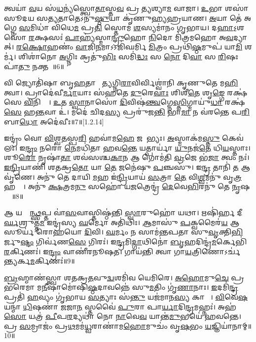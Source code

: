 𑌤𑍍𑌵𑌯𑌾॑ \ul{𑌵}𑌯 𑌸॑\ul{𑌧}𑌨𑍍𑌯॑𑌸𑍍𑌤𑍍𑌵𑍋\ul{𑌤𑌾}𑌸𑍍𑌤\ul{𑌵} 𑌪𑍍𑌰𑌣𑍀᳚𑌤𑍍𑌯𑌶𑍍𑌯𑌾\ul{𑌮} 𑌵𑌾𑌜𑌾\sn{}। \ul{𑌉}𑌭𑌾 𑌶𑌸𑌾॑ 𑌸𑍂𑌦𑌯 𑌸𑌤𑍍𑌯𑌤𑌾𑌤𑍇𑌽𑌨𑍁\ul{𑌷𑍍𑌠𑍁}𑌯𑌾 𑌕𑍃॑𑌣𑍁𑌹𑍍𑌯𑌹𑍍𑌰𑌯𑌾𑌣। \ul{𑌅}𑌯𑌾 𑌤𑍇॑ 𑌅𑌗𑍍𑌨𑍇 \ul{𑌸}𑌮𑌿𑌧𑌾॑ 𑌵𑌿𑌧𑍇\ul{𑌮} 𑌪𑍍𑌰\ul{𑌤𑌿} 𑌸𑍍𑌤𑍋𑌮॑ \ul{𑌶}𑌸𑍍𑌯𑌮𑌾॑𑌨𑌂 𑌗𑍃𑌭𑌾𑌯। 𑌦\ul{𑌹𑌾}𑌽॒𑌶𑌸𑍋॑ \ul{𑌰}𑌕𑍍𑌷𑌸𑌃॑ \ul{𑌪𑌾}𑌹𑍍𑌯॑𑌸𑍍𑌮𑌾\ul{𑌨𑍍𑌦𑍍𑌰𑍁}𑌹𑍋 \ul{𑌨𑌿}𑌦𑍋 𑌮𑌿॑𑌤𑍍𑌰𑌮𑌹𑍋 𑌅\ul{𑌵}𑌦𑍍𑌯𑌾𑌤𑍍। \ul{𑌰}\ul{𑌕𑍍𑌷𑍋}𑌹𑌣𑌂॑ \ul{𑌵𑌾}𑌜𑌿\ul{𑌨}𑌮𑌾𑌽𑌽𑌜𑌿॑𑌘𑌰𑍍𑌮𑌿 \ul{𑌮𑌿}𑌤𑍍𑌰𑌂 𑌪𑍍𑌰𑌥𑌿॑\ul{𑌷𑍍𑌠}𑌮𑍁𑌪॑ 𑌯𑌾\ul{𑌮𑌿} 𑌶𑌰𑍍𑌮॑। 𑌶𑌿𑌶𑌾॑𑌨𑍋 \ul{𑌅}𑌗𑍍𑌨𑌿𑌃 𑌕𑍍𑌰𑌤𑍁॑\ul{𑌭𑌿𑌃} 𑌸𑌮𑌿॑\ul{𑌦𑍍𑌧𑌃} 𑌸 \ul{𑌨𑍋} 𑌦𑌿\ul{𑌵𑌾} 𑌸 \ul{𑌰𑌿}𑌷𑌃 𑌪𑌾॑\ul{𑌤𑍁} 𑌨𑌕𑍍𑌤𑌮𑍍᳚॥6॥

 𑌵𑌿 𑌜𑍍𑌯𑍋𑌤𑌿॑𑌷𑌾 𑌬𑍃\ul{𑌹}𑌤𑌾 𑌭𑌾᳚\ul{𑌤𑍍𑌯}𑌗𑍍𑌨𑌿\ul{𑌰𑌾}𑌵𑌿𑌰𑍍𑌵𑌿𑌶𑍍𑌵𑌾॑𑌨𑌿 𑌕𑍃𑌣𑍁𑌤𑍇 𑌮\ul{𑌹𑌿}𑌤𑍍𑌵𑌾। 𑌪𑍍𑌰𑌾𑌦𑍇॑𑌵𑍀\ul{𑌰𑍍𑌮𑌾}𑌯𑌾𑌃 𑌸॑𑌹𑌤𑍇 \ul{𑌦𑍁}𑌰𑍇\ul{𑌵𑌾𑌃} 𑌶𑌿𑌶𑍀॑\ul{𑌤𑍇} 𑌶𑍃\ul{𑌙𑍍𑌗𑍇} 𑌰𑌕𑍍𑌷॑𑌸𑍇 \ul{𑌵𑌿}𑌨𑌿𑌕𑍍𑌷𑍇᳚। \ul{𑌉}𑌤 \ul{𑌸𑍍𑌵𑌾}𑌨𑌾𑌸𑍋॑ \ul{𑌦𑌿}𑌵𑌿𑌷॑\ul{𑌨𑍍𑌤𑍍𑌵}𑌗𑍍𑌨𑍇\ul{𑌸𑍍𑌤𑌿}𑌗𑍍𑌮𑌾𑌯𑍁॑\ul{𑌧𑌾} 𑌰𑌕𑍍𑌷॑\ul{𑌸𑍇} 𑌹\ul{𑌨𑍍𑌤}𑌵𑌾 𑌉॑। 𑌮𑌦𑍇॑ 𑌚𑌿𑌦\ul{𑌸𑍍𑌯} 𑌪𑍍𑌰𑌰𑍁॑𑌜\ul{𑌨𑍍𑌤𑌿} 𑌭𑌾\ul{𑌮𑌾} 𑌨 𑌵॑𑌰𑌨𑍍𑌤𑍇 𑌪\ul{𑌰𑌿}𑌬𑌾\ul{𑌧𑍋} 𑌅𑌦𑍇॑𑌵𑍀𑌃॥7॥[1.2.14]

𑌇𑌨𑍍𑌦𑍍𑌰𑌂॑ 𑌵𑍋 \ul{𑌵𑌿}𑌶𑍍𑌵\ul{𑌤}𑌸𑍍𑌪\ul{𑌰𑌿} 𑌹𑌵𑌾॑𑌮\ul{𑌹𑍇} 𑌜𑌨𑍇᳚𑌭𑍍𑌯𑌃। \ul{𑌅}𑌸𑍍𑌮𑌾𑌕॑𑌮\ul{𑌸𑍍𑌤𑍁} 𑌕𑍇𑌵॑𑌲𑌃। 𑌇\ul{𑌨𑍍𑌦𑍍𑌰𑌂} 𑌨𑌰𑍋॑ \ul{𑌨𑍇}𑌮𑌧𑌿॑𑌤𑌾 𑌹𑌵\ul{𑌨𑍍𑌤𑍇} 𑌯𑌤𑍍𑌪𑌾𑌰𑍍𑌯𑌾॑ \ul{𑌯𑍁}𑌨𑌜॑\ul{𑌤𑍇} 𑌧𑌿\ul{𑌯}𑌸𑍍𑌤𑌾𑌃। 𑌶𑍂\ul{𑌰𑍋} 𑌨𑍃𑌷𑌾॑\ul{𑌤𑌾} 𑌶𑌵॑𑌸𑌶𑍍𑌚\ul{𑌕𑌾}𑌨 𑌆 𑌗𑍋𑌮॑𑌤𑌿 \ul{𑌵𑍍𑌰}𑌜𑍇 𑌭॑\ul{𑌜𑌾} 𑌤𑍍𑌵𑌂 𑌨𑌃॑। \ul{𑌇}\ul{𑌨𑍍𑌦𑍍𑌰𑌿}𑌯𑌾𑌣𑌿॑ 𑌶𑌤𑌕𑍍𑌰\ul{𑌤𑍋} 𑌯𑌾 \ul{𑌤𑍇} 𑌜𑌨𑍇॑𑌷𑍁 \ul{𑌪}𑌞𑍍𑌚𑌸𑍁॑। 𑌇\ul{𑌨𑍍𑌦𑍍𑌰} 𑌤𑌾𑌨𑌿॑ \ul{𑌤} 𑌆 𑌵𑍃॑𑌣𑍇। 𑌅𑌨𑍁॑ 𑌤𑍇 𑌦𑌾𑌯𑌿 \ul{𑌮}𑌹 𑌇॑\ul{𑌨𑍍𑌦𑍍𑌰𑌿}𑌯𑌾𑌯॑ \ul{𑌸}𑌤𑍍𑌰𑌾 \ul{𑌤𑍇} 𑌵𑌿\ul{𑌶𑍍𑌵}𑌮𑌨𑍁॑ 𑌵𑍃\ul{𑌤𑍍𑌰}𑌹𑌤𑍍𑌯𑍇᳚। 𑌅𑌨𑍁॑ \ul{𑌕𑍍𑌷}𑌤𑍍𑌰𑌮\ul{𑌨𑍁} 𑌸𑌹𑍋॑ 𑌯\ul{𑌜}𑌤𑍍𑌰𑍇𑌨𑍍𑌦𑍍𑌰॑ \ul{𑌦𑍇}𑌵𑍇\ul{𑌭𑌿}𑌰𑌨𑍁॑ 𑌤𑍇 \ul{𑌨𑍃}𑌷𑌹𑍍𑌯𑍇᳚॥8॥

𑌆 𑌯𑌸𑍍𑌮𑌿᳚\ul{𑌨𑍍𑌥𑍍𑌸}𑌪𑍍𑌤 𑌵𑌾॑\ul{𑌸}𑌵𑌾𑌸𑍍𑌤𑌿𑌷𑍍𑌠॑𑌨𑍍𑌤𑌿 \ul{𑌸𑍍𑌵𑌾}𑌰𑍁𑌹𑍋॑ 𑌯𑌥𑌾। 𑌋𑌷𑌿॑𑌰𑍍\mbox{}𑌹 𑌦𑍀\ul{𑌰𑍍𑌘}𑌶𑍍𑌰𑍁𑌤𑍍𑌤॑\ul{𑌮} 𑌇𑌨𑍍𑌦𑍍𑌰॑𑌸𑍍𑌯 \ul{𑌘}𑌰𑍍𑌮𑍋 𑌅𑌤𑌿॑𑌥𑌿𑌃। \ul{𑌆}𑌮𑌾𑌸𑍁॑ \ul{𑌪}𑌕𑍍𑌵𑌮𑍈𑌰॑\ul{𑌯} 𑌆 𑌸𑍂𑌰𑍍𑌯॑ 𑌰𑍋𑌹𑌯𑍋 \ul{𑌦𑌿}𑌵𑌿। \ul{𑌘}𑌰𑍍𑌮𑌂 𑌨 𑌸𑌾𑌮॑𑌨𑍍𑌤𑌪𑌤𑌾 𑌸𑍁\ul{𑌵𑍃}𑌕𑍍𑌤𑌿\ul{𑌭𑌿}𑌰𑍍𑌜𑍁\ul{𑌷𑍍𑌟𑌂} 𑌗𑌿𑌰𑍍𑌵॑𑌣\ul{𑌸𑍇} 𑌗𑌿𑌰𑌃॑। 𑌇\ul{𑌨𑍍𑌦𑍍𑌰}𑌮𑌿\ul{𑌦𑍍𑌗𑌾}𑌥𑌿𑌨𑍋॑ \ul{𑌬𑍃}𑌹𑌦𑌿𑌨𑍍𑌦𑍍𑌰॑\ul{𑌮}𑌰𑍍𑌕𑍇𑌭𑌿॑\ul{𑌰}𑌰𑍍𑌕𑌿𑌣𑌃॑। 𑌇\ul{𑌨𑍍𑌦𑍍𑌰𑌂} 𑌵𑌾𑌣𑍀॑𑌰𑌨𑍂𑌷𑌤। 𑌗𑌾𑌯॑𑌨𑍍𑌤𑌿 𑌤𑍍𑌵𑌾 𑌗𑌾\ul{𑌯}𑌤𑍍𑌰𑌿𑌣𑍋𑌽𑌰𑍍𑌚॑\ul{𑌨𑍍𑌤𑍍𑌯}𑌰𑍍𑌕\ul{𑌮}𑌰𑍍𑌕𑌿𑌣𑌃॑॥9॥

 \ul{𑌬𑍍𑌰}𑌹𑍍𑌮𑌾𑌣॑𑌸𑍍𑌤𑍍𑌵𑌾 𑌶𑌤𑌕𑍍𑌰\ul{𑌤}𑌵𑍁\ul{𑌦𑍍𑌵}\ul{}𑌶𑌮𑌿॑𑌵 𑌯𑍇𑌮𑌿𑌰𑍇। \ul{𑌅}\ul{}\ul{𑌹𑍋}𑌮𑍁\ul{𑌚𑍇} 𑌪𑍍𑌰 𑌭॑𑌰𑍇𑌮𑌾 𑌮\ul{𑌨𑍀}𑌷𑌾𑌮𑍋॑𑌷𑌿\ul{𑌷𑍍𑌠}𑌦𑌾𑌵𑌨𑍍𑌨𑍇॑ 𑌸𑍁\ul{𑌮}𑌤𑌿𑌂 𑌗𑍃॑\ul{𑌣𑌾}𑌨𑌾𑌃। \ul{𑌇}𑌦𑌮𑌿॑\ul{𑌨𑍍𑌦𑍍𑌰} 𑌪𑍍𑌰𑌤𑌿॑ \ul{𑌹}𑌵𑍍𑌯𑌂 𑌗𑍃॑𑌭𑌾𑌯 \ul{𑌸}𑌤𑍍𑌯𑌾𑌃 𑌸॑\ul{𑌨𑍍𑌤𑍁} 𑌯𑌜॑𑌮𑌾𑌨\ul{𑌸𑍍𑌯} 𑌕𑌾𑌮𑌾𑌃᳚। \ul{𑌵𑌿}𑌵𑍇\ul{𑌷} 𑌯𑌨𑍍𑌮𑌾॑ \ul{𑌧𑌿}𑌷𑌣𑌾॑ \ul{𑌜}𑌜𑌾\ul{𑌨} 𑌸𑍍𑌤𑌵𑍈॑ \ul{𑌪𑍁}𑌰𑌾 𑌪𑌾\ul{𑌰𑍍𑌯𑌾}𑌦𑌿\ul{𑌨𑍍𑌦𑍍𑌰}𑌮𑌹𑍍𑌨𑌃॑। 𑌅𑌹॑\ul{𑌸𑍋} 𑌯𑌤𑍍𑌰॑ \ul{𑌪𑍀}𑌪\ul{𑌰}𑌦𑍍𑌯𑌥𑌾॑ 𑌨𑍋 \ul{𑌨𑌾}𑌵𑍇\ul{𑌵} 𑌯𑌾𑌨𑍍𑌤॑\ul{𑌮𑍁}𑌭𑌯𑍇॑ 𑌹𑌵𑌨𑍍𑌤𑍇। 𑌪𑍍𑌰 \ul{𑌸}𑌮𑍍𑌰𑌾𑌜𑌂॑ 𑌪𑍍𑌰\ul{𑌥}𑌮𑌮॑\ul{𑌧𑍍𑌵}𑌰𑌾𑌣𑌾॑𑌮\ul{𑌹𑍋}𑌮𑍁𑌚𑌂॑ 𑌵𑍃\ul{𑌷}𑌭𑌂 \ul{𑌯}𑌜𑍍𑌞𑌿𑌯𑌾॑𑌨𑌾𑌮𑍍॥10॥
 
